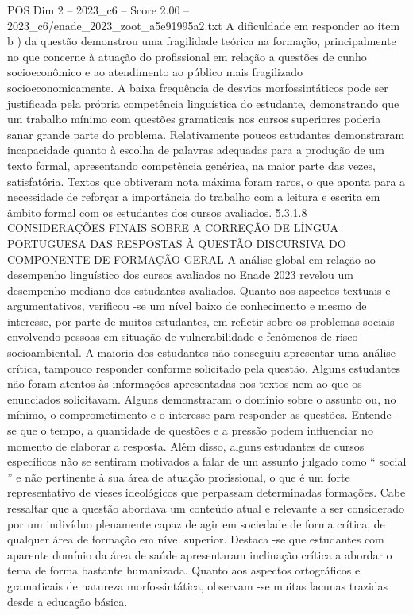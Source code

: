 \begin{textsample}{POS Dim 2 – 2023\_c6 – Score 2.00 – 2023\_c6/enade\_2023\_zoot\_a5e91995a2.txt}
A dificuldade em responder ao item b ) da questão demonstrou uma fragilidade teórica na formação, principalmente no que concerne à atuação do profissional em relação a questões de cunho socioeconômico e ao atendimento ao público mais fragilizado socioeconomicamente.
A baixa frequência de desvios morfossintáticos pode ser justificada pela própria competência linguística do estudante, demonstrando que um trabalho mínimo com questões gramaticais nos cursos superiores poderia sanar grande parte do problema.
Relativamente poucos estudantes demonstraram incapacidade quanto à escolha de palavras adequadas para a produção de um texto formal, apresentando competência genérica, na maior parte das vezes, satisfatória.
Textos que obtiveram nota máxima foram raros, o que aponta para a necessidade de reforçar a importância do trabalho com a leitura e escrita em âmbito formal com os estudantes dos cursos avaliados. 5.3.1.8 CONSIDERAÇÕES FINAIS SOBRE A CORREÇÃO DE LÍNGUA PORTUGUESA DAS RESPOSTAS À QUESTÃO DISCURSIVA DO COMPONENTE DE FORMAÇÃO GERAL A análise global em relação ao desempenho linguístico dos cursos avaliados no Enade 2023 revelou um desempenho mediano dos estudantes avaliados.
Quanto aos aspectos textuais e argumentativos, verificou -se um nível baixo de conhecimento e mesmo de interesse, por parte de muitos estudantes, em refletir sobre os problemas sociais envolvendo pessoas em situação de vulnerabilidade e fenômenos de risco socioambiental.
A maioria dos estudantes não conseguiu apresentar uma análise crítica, tampouco responder conforme solicitado pela questão.
Alguns estudantes não foram atentos às informações apresentadas nos textos nem ao que os enunciados solicitavam.
Alguns demonstraram o domínio sobre o assunto ou, no mínimo, o comprometimento e o interesse para responder as questões.
Entende -se que o tempo, a quantidade de questões e a pressão podem influenciar no momento de elaborar a resposta.
Além disso, alguns estudantes de cursos específicos não se sentiram motivados a falar de um assunto julgado como “ social ” e não pertinente à sua área de atuação profissional, o que é um forte representativo de vieses ideológicos que perpassam determinadas formações.
Cabe ressaltar que a questão abordava um conteúdo atual e relevante a ser considerado por um indivíduo plenamente capaz de agir em sociedade de forma crítica, de qualquer área de formação em nível superior.
Destaca -se que estudantes com aparente domínio da área de saúde apresentaram inclinação crítica a abordar o tema de forma bastante humanizada.
Quanto aos aspectos ortográficos e gramaticais de natureza morfossintática, observam -se muitas lacunas trazidas desde a educação básica.

\end{textsample}
